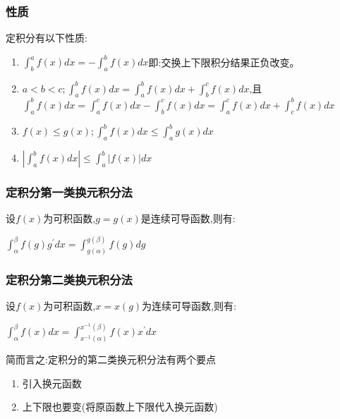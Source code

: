 \documentclass[UTF8]{ctexbook}
\newcommand{\derivative}{^\prime}
\newcommand{\defFunction}[1]{f(#1)}
\newcommand{\definiteIntegral}[2]{\int^{#1}_{#2}}
\begin{document}
{{{\subsubsection{性质}{
  定积分有以下性质:
  \begin{enumerate}
    \item $\definiteIntegral{a}{b}\defFunction{x}dx = -\definiteIntegral{b}{a}\defFunction{x}dx$即:交换上下限积分结果正负改变。
    \item $a < b < c; \definiteIntegral{b}{a}\defFunction{x}dx = \definiteIntegral{b}{a}\defFunction{x}dx + \definiteIntegral{c}{b}\defFunction{x}dx$,且$\definiteIntegral{b}{a}\defFunction{x}dx = \definiteIntegral{c}{a}\defFunction{x}dx - \definiteIntegral{c}{b}\defFunction{x}dx = \definiteIntegral{c}{a}\defFunction{x}dx + \definiteIntegral{b}{c}\defFunction{x}dx$
    \item $\defFunction{x} \leq g(x); \definiteIntegral{b}{a}\defFunction{x}dx \leq \definiteIntegral{b}{a}g(x)dx$
    \item $|\definiteIntegral{b}{a}\defFunction{x}dx|\leq\definiteIntegral{b}{a}|\defFunction{x}|dx$
  \end{enumerate}
}%

\subsubsection{定积分第一类换元积分法}{
  设$\defFunction{x}$为可积函数,$g = g(x)$是连续可导函数,则有:

  $\definiteIntegral{\beta}{\alpha} \defFunction{g}g\derivative dx = \definiteIntegral{g(\beta)}{g(\alpha)} \defFunction{g}dg$
}%

\subsubsection{定积分第二类换元积分法}{
  设$\defFunction{x}$为可积函数,$x = x(g)$为连续可导函数,则有:

  $\definiteIntegral{\beta}{\alpha} \defFunction{x}dx = \definiteIntegral{x^{-1}(\beta)}{x^{-1}(\alpha)}\defFunction{x}x\derivative dx$

  简而言之:定积分的第二类换元积分法有两个要点
  \begin{enumerate}
    \item 引入换元函数
    \item 上下限也要变(将原函数上下限代入换元函数)
  \end{enumerate}
}%

}}}
\end{document}
